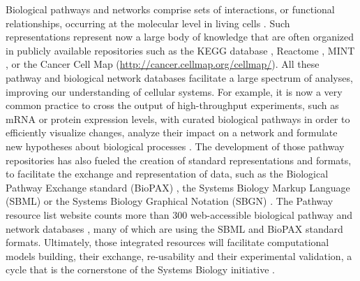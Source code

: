 \documentclass[10pt]{bmc_article}
\newenvironment{bmcformat}{\baselineskip20pt\sloppy\setboolean{publ}{false}}{\baselineskip20pt\sloppy}
\begin{document}
\begin{bmcformat}
Biological pathways and networks comprise sets of interactions, or functional
relationships, occurring at the molecular level in living cells
\cite{adriaens2008public, cary2005pathway}. Such representations represent now
a large body of knowledge that are often organized in publicly available
repositories such as the KEGG database \cite{ogata1999kegg}, Reactome
\cite{joshi2005reactome}, MINT \cite{zanzoni2002mint}, or the Cancer Cell Map
(\url{http://cancer.cellmap.org/cellmap/}). All these pathway and biological
network databases facilitate a large spectrum of analyses, improving our
understanding of cellular systems. For example, it is now a very common
practice to cross the output of high-throughput experiments, such as mRNA or
protein expression levels, with curated biological pathways in
order to efficiently visualize changes, analyze their impact on a network and
formulate new hypotheses about
biological processes \cite{saraiya2005visualizing,
gehlenborg2010visualization}. The development of those pathway repositories has
also fueled the creation of standard representations and formats, to facilitate
the exchange and representation of data, such as the Biological Pathway
Exchange standard (BioPAX) \cite{demir2010biopax}, the Systems Biology Markup
Language (SBML) \cite{hucka2003systems} or the Systems Biology Graphical
Notation (SBGN) \cite{le2009systems}. The Pathway resource list website counts
more than 300 web-accessible biological pathway and network databases
\cite{bader2006pathguide}, many of which are using the SBML and BioPAX standard
formats. Ultimately, those integrated resources will facilitate computational
models building, their exchange, re-usability and their experimental validation, a cycle that is the
cornerstone of the Systems Biology initiative \cite{karlebach2008modelling,
kitano2002systems, ideker2001new}.


\end{bmcformat}
\end{document}
